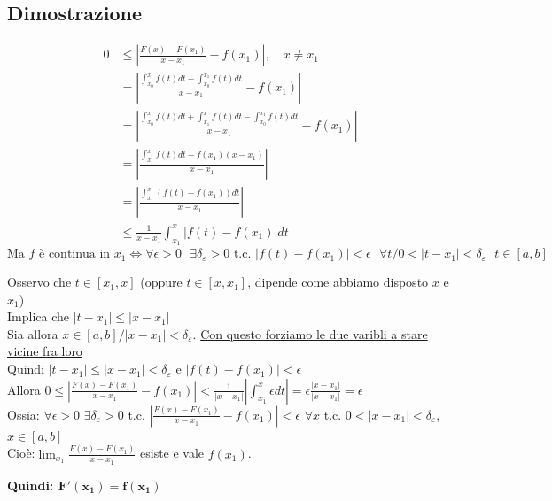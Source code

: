 \documentclass{article}
\newcommand{\DeltaEp}{\delta_{\varepsilon}} %
\newcommand{\vSpace}{\vspace{1em}}
\begin{document}
\begin{flushleft}
\subsection{Dimostrazione}

\begin{align*}
    0 &\leq \left| \frac{F(x) - F(x_1)}{x - x_1} - f(x_1) \right|, \quad x \neq x_1 \\
    &= \left| \frac{\int_{x_0}^{x} f(t) dt - \int_{x_0}^{x_1} f(t) dt}{x - x_1} - f(x_1) \right| \\
    &= \left| \frac{\int_{x_0}^{x} f(t) dt + \int_{x_1}^{x} f(t) dt - \int_{x_0}^{x_1} f(t) dt}{x - x_1} - f(x_1) \right| \\
    &= \left| \frac{\int_{x_1}^{x} f(t) dt - f(x_1)(x - x_1)}{x - x_1} \right| \\
    &= \left| \frac{\int_{x_1}^{x} (f(t) - f(x_1)) dt}{x - x_1} \right| \\
    &\leq \frac{1}{x - x_1} \int_{x_1}^{x} |f(t) - f(x_1)| dt
\end{align*}
\vSpace
\[ 
  \text{Ma } f \text{ è continua in }x_1 \iff \forall\epsilon>0\text{ }\exists \DeltaEp>0\text{ t.c. }\left|f(t) - f(x_1)\right|<\epsilon\text{ }\forall t / 0 < \left|t-x_1\right|<\DeltaEp\text{ }t\in[a,b]
\]

Osservo che $t\in[x_1, x]$ (oppure $t\in[x, x_1]$, dipende come abbiamo disposto $x$ e $x_1$)
\\Implica che $\left|t-x_1\right| \leq \left|x - x_1\right|$
\\Sia allora $x\in[a, b] / \left|x-x_1\right|<\DeltaEp$. \underline{Con questo forziamo le due varibli a stare vicine fra loro}
\\Quindi $\left|t-x_1\right| \leq \left|x-x_1\right|<\DeltaEp$ e $\left|f(t) - f(x_1)\right|<\epsilon$
\\Allora $0\leq\left|\frac{F(x)-F(x_1)}{x-x_1}-f(x_1)\right| < \frac{1}{\left|x-x_1\right|}\left|\int_{x_1}^{x}\epsilon dt\right| = \epsilon \frac{\left|x-x_1\right|}{\left|x-x_1\right|} = \epsilon$
\\Ossia: $\forall \epsilon > 0$ $\exists \DeltaEp > 0$ t.c. $\left|\frac{F(x)-F(x_1)}{x-x_1}-f(x_1)\right|<\epsilon$ $\forall x$ t.c. $0<\left|x-x_1\right|<\DeltaEp$, $x\in[a,b]$
\\Cioè:$\lim_{x_1}\frac{F(x)-F(x_1)}{x-x_1}$ esiste e vale $f(x_1)$.
\\\begin{center} \textbf{Quindi: $\mathbf{F'(x_1) = f(x_1)}$}\end{center}


\end{flushleft}
\end{document}
